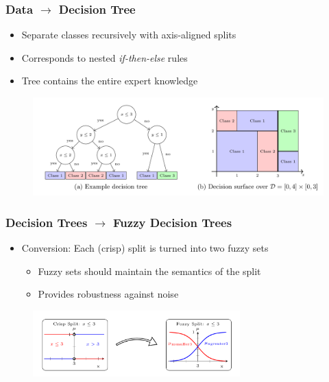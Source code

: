 \documentclass[
	10pt,
	t		%
]{beamer}
\begin{document}
\begin{frame}
	\frametitle{Data $\rightarrow$ Decision Tree}
	
	\begin{itemize}
		\item Separate classes recursively with axis-aligned splits
		\item Corresponds to nested \textit{if-then-else} rules
		\item Tree contains the entire expert knowledge
	\end{itemize}
	
	\vspace{0.2cm}
	
	\begin{figure}
		\centering
		\includegraphics[width=1\textwidth]{figures/decision-tree.png}
	\end{figure}
	
\end{frame}

\begin{frame}
	\frametitle{Decision Trees $\rightarrow$ Fuzzy Decision Trees}
	
	\begin{itemize}
		\item Conversion: Each (crisp) split is turned into two fuzzy sets
		      \begin{itemize}
			      \item Fuzzy sets should maintain the semantics of the split
			      \item Provides robustness against noise
		      \end{itemize}
	\end{itemize}
	
	\begin{figure}
		\centering
		\includegraphics[width=8cm]{figures/leaf-conversion.png}
	\end{figure}
	
\end{frame}
\end{document}
